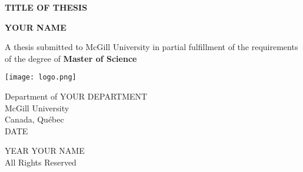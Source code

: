 %
%

\begin{titlepage}
    \begin{center}
        \vspace*{1cm}

        \huge
        \textbf{TITLE OF THESIS}

        \vspace{0.5cm}
        \large

        \vspace{1.5cm}

        \textbf{YOUR NAME}

        \vfill

        A thesis submitted to McGill University in partial fulfillment of the requirements of the degree of \textbf{Master of Science}

        \vspace{0.8cm}
       
       \texttt{[image: logo.png]}

        \large
        Department of YOUR DEPARTMENT\\
        McGill University\\
        Canada, Qu\'{e}bec\\
        DATE

        \vspace{1.5cm}

        \textcopyright{} YEAR YOUR NAME\\
        All Rights Reserved
    \end{center}
\end{titlepage}
